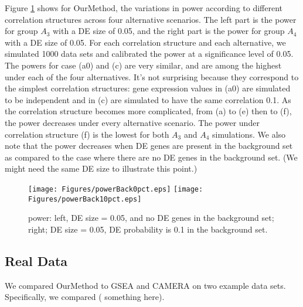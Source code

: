 \documentclass[11pt, a4paper]{article}
\begin{document}
		Figure \ref{fig:power} shows for OurMethod, the variations in power according to different correlation structures across four alternative scenarios. The left part is the power for group $A_3$ with a DE size of 0.05, and the right part is the power for group $A_4$ with a DE size of 0.05. For each correlation structure and each alternative, we simulated 1000 data sets and calibrated the power at a significance level of 0.05. 
		The powers for case (a0) and (c) are very similar, and are among the highest under each of the four alternatives. It's not surprising because they correspond to the simplest correlation structures: gene expression values in (a0) are simulated to be independent and in (c) are simulated to have the same correlation 0.1. As the correlation structure becomes more complicated, from (a) to (e) then to (f), the power decreases under every alternative scenario. The power under correlation structure (f) is the lowest for both $A_3$ and $A_4$ simulations. We also note that the power decreases when DE genes are present in the background set as compared to the case where there are no DE genes in the background set. (We might need the same DE size to illustrate this point.)
		
			\begin{figure}[H]
				\caption{power: left, DE size = 0.05, and no DE genes in the background set; right; DE size = 0.05, DE probability is 0.1 in the background set.}\label{fig:power}
				\begin{center}
					\texttt{[image: Figures/powerBack0pct.eps]}
					\texttt{[image: Figures/powerBack10pct.eps]}
				\end{center} 
			\end{figure} 
		
		\subsection{Real Data}
		We compared OurMethod to GSEA and CAMERA on two example data sets. Specifically, we compared ( something here).
		
\end{document}

